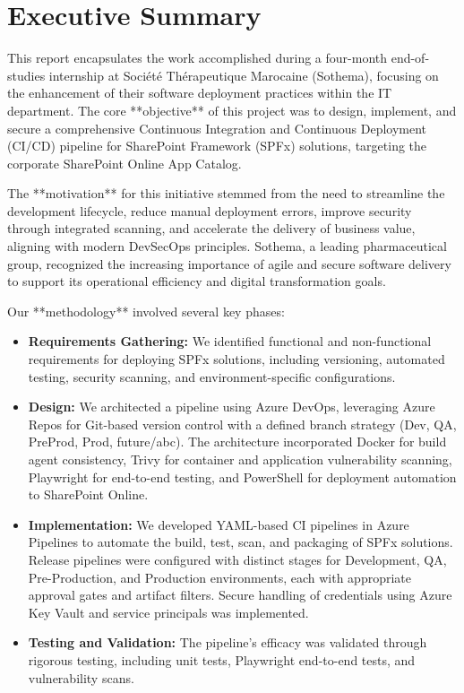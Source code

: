 \chapter{Executive Summary}
\label{chap:execsummary}

This report encapsulates the work accomplished during a four-month end-of-studies internship at Société Thérapeutique Marocaine (Sothema), focusing on the enhancement of their software deployment practices within the IT department. The core **objective** of this project was to design, implement, and secure a comprehensive Continuous Integration and Continuous Deployment (CI/CD) pipeline for SharePoint Framework (SPFx) solutions, targeting the corporate SharePoint Online App Catalog.

The **motivation** for this initiative stemmed from the need to streamline the development lifecycle, reduce manual deployment errors, improve security through integrated scanning, and accelerate the delivery of business value, aligning with modern DevSecOps principles. Sothema, a leading pharmaceutical group, recognized the increasing importance of agile and secure software delivery to support its operational efficiency and digital transformation goals.

Our **methodology** involved several key phases:
\begin{itemize}
    \item \textbf{Requirements Gathering:} We identified functional and non-functional requirements for deploying SPFx solutions, including versioning, automated testing, security scanning, and environment-specific configurations.
    \item \textbf{Design:} We architected a pipeline using Azure DevOps, leveraging Azure Repos for Git-based version control with a defined branch strategy (Dev, QA, PreProd, Prod, future/abc). The architecture incorporated Docker for build agent consistency, Trivy for container and application vulnerability scanning, Playwright for end-to-end testing, and PowerShell for deployment automation to SharePoint Online.
    \item \textbf{Implementation:} We developed YAML-based CI pipelines in Azure Pipelines to automate the build, test, scan, and packaging of SPFx solutions. Release pipelines were configured with distinct stages for Development, QA, Pre-Production, and Production environments, each with appropriate approval gates and artifact filters. Secure handling of credentials using Azure Key Vault and service principals was implemented.
    \item \textbf{Testing and Validation:} The pipeline's efficacy was validated through rigorous testing, including unit tests, Playwright end-to-end tests, and vulnerability scans.
\end{itemize}

